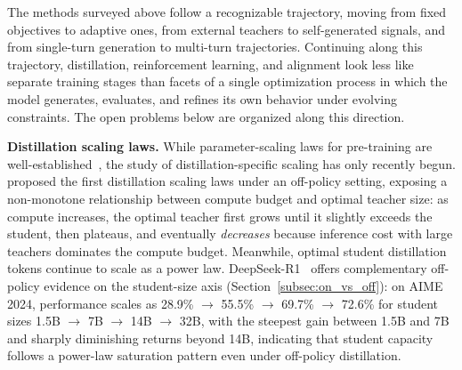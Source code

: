 \documentclass{article} %
\begin{document}
The methods surveyed above follow a recognizable trajectory, moving from fixed objectives to adaptive ones, from external teachers to self-generated signals, and from single-turn generation to multi-turn trajectories. Continuing along this trajectory, distillation, reinforcement learning, and alignment look less like separate training stages than facets of a single optimization process in which the model generates, evaluates, and refines its own behavior under evolving constraints. The open problems below are organized along this direction.

\textbf{Distillation scaling laws.} While parameter-scaling laws for pre-training are well-established~\citep{2001.08361,2203.15556}, the study of distillation-specific scaling has only recently begun. \citet{2502.08606} proposed the first distillation scaling laws under an off-policy setting, exposing a non-monotone relationship between compute budget and optimal teacher size: as compute increases, the optimal teacher first grows until it slightly exceeds the student, then plateaus, and eventually \emph{decreases} because inference cost with large teachers dominates the compute budget. Meanwhile, optimal student distillation tokens continue to scale as a power law. DeepSeek-R1~\citep{2501.12948} offers complementary off-policy evidence on the student-size axis (Section~\ref{subsec:on_vs_off}): on AIME 2024, performance scales as 28.9\% $\to$ 55.5\% $\to$ 69.7\% $\to$ 72.6\% for student sizes 1.5B $\to$ 7B $\to$ 14B $\to$ 32B, with the steepest gain between 1.5B and 7B and sharply diminishing returns beyond 14B, indicating that student capacity follows a power-law saturation pattern even under off-policy distillation.
\end{document}

